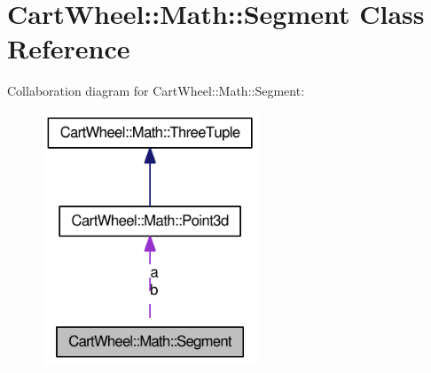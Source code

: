 \hypertarget{classCartWheel_1_1Math_1_1Segment}{
\section{CartWheel::Math::Segment Class Reference}
\label{classCartWheel_1_1Math_1_1Segment}
}


Collaboration diagram for CartWheel::Math::Segment:\nopagebreak
\begin{figure}[H]
\begin{center}
\leavevmode
\includegraphics[width=182pt]{classCartWheel_1_1Math_1_1Segment__coll__graph}
\end{center}
\end{figure}
